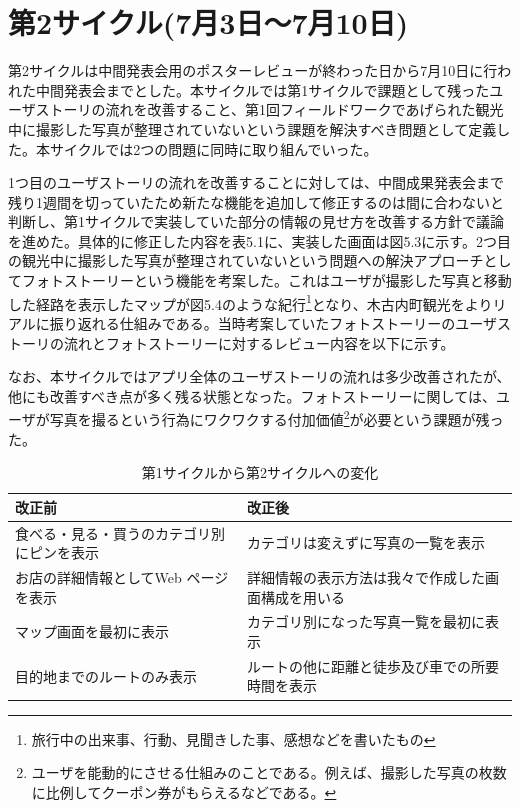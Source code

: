 \section{第2サイクル(7月3日〜7月10日)}
第2サイクルは中間発表会用のポスターレビューが終わった日から7月10日に行われた中間発表会までとした。本サイクルでは第1サイクルで課題として残ったユーザストーリの流れを改善すること、第1回フィールドワークであげられた観光中に撮影した写真が整理されていないという課題を解決すべき問題として定義した。本サイクルでは2つの問題に同時に取り組んでいった。
\par 1つ目のユーザストーリの流れを改善することに対しては、中間成果発表会まで残り1週間を切っていたため新たな機能を追加して修正するのは間に合わないと判断し、第1サイクルで実装していた部分の情報の見せ方を改善する方針で議論を進めた。具体的に修正した内容を表5.1に、実装した画面は図5.3に示す。2つ目の観光中に撮影した写真が整理されていないという問題への解決アプローチとしてフォトストーリーという機能を考案した。これはユーザが撮影した写真と移動した経路を表示したマップが図5.4のような紀行\footnote{旅行中の出来事、行動、見聞きした事、感想などを書いたもの}となり、木古内町観光をよりリアルに振り返れる仕組みである。当時考案していたフォトストーリーのユーザストーリの流れとフォトストーリーに対するレビュー内容を以下に示す。
\par なお、本サイクルではアプリ全体のユーザストーリの流れは多少改善されたが、他にも改善すべき点が多く残る状態となった。フォトストーリーに関しては、ユーザが写真を撮るという行為にワクワクする付加価値\footnote{ユーザを能動的にさせる仕組みのことである。例えば、撮影した写真の枚数に比例してクーポン券がもらえるなどである。}が必要という課題が残った。

\begin{table}[htb]
\centering
\caption{第1サイクルから第2サイクルへの変化}
  \begin{tabular}{|l|l|} \hline
    改正前&改正後  \\ \hline
    食べる・見る・買うのカテゴリ別にピンを表示 & \parbox{20zw}{カテゴリは変えずに写真の一覧を表示} \\  \hline
    お店の詳細情報としてWeb ページを表示 &\parbox{20zw}{詳細情報の表示方法は我々で作成した画面構成を用いる} \rule[-6mm]{0mm}{14mm} \\ \hline
    マップ画面を最初に表示 & \parbox{20zw}{カテゴリ別になった写真一覧を最初に表示}\\ \hline
    目的地までのルートのみ表示 & \parbox{20zw}{ルートの他に距離と徒歩及び車での所要時間を表示} \rule[-6mm]{0mm}{14mm} \\ \hline
  \end{tabular} 
\end{table}


